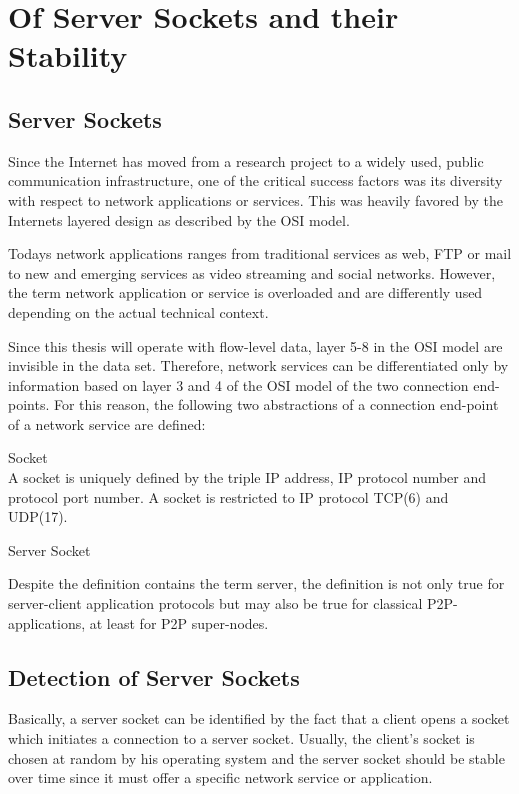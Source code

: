 \chapter{Of Server Sockets and their Stability\label{chapter:sockets}}

\section{Server Sockets}
Since the Internet has moved from a research project to a widely used, public communication infrastructure, one of the critical success factors was its diversity with respect to network applications or services. This was heavily favored by the Internets layered design as described by the OSI model. 

Todays network applications ranges from traditional services as web, FTP or mail to new and emerging services as video streaming and social networks. However, the term network application or service is overloaded and are differently used depending on the actual technical context.

Since this thesis will operate with flow-level data, layer 5-8 in the OSI model are invisible in the data set. Therefore, network services can be differentiated only by information based on layer 3 and 4 of the OSI model of the two connection end-points. For this reason, the following two abstractions of a connection end-point of a network service are defined:
\begin{defn}{Socket\\}
A socket is uniquely defined by the triple IP address, IP protocol number and protocol port number. A socket is restricted to IP protocol TCP(6) and UDP(17).
\end{defn}

\begin{defn}{Server Socket\\}
\end{defn}

Despite the definition contains the term server, the definition is not only true for server-client application protocols but may also be true for classical P2P-applications, at least for P2P super-nodes. 

\section{Detection of Server Sockets\label{section:socket_detection}}
Basically, a server socket can be identified by the fact that a client opens a socket which initiates a connection to a server socket. Usually, the client's socket is chosen at random by his operating system and the server socket should be stable over time since it must offer a specific network service or application. 


